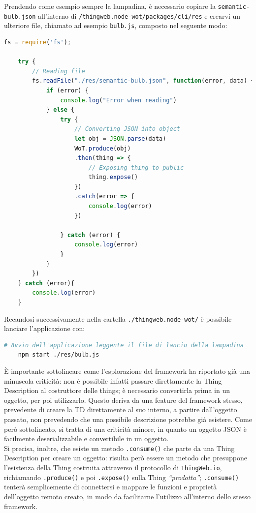 \documentclass[12pt,a4paper,openright,oneside]{report}
\newcommand{\quotes}[1]{``#1''}
\begin{document}
Prendendo come esempio sempre la lampadina, è necessario copiare la \texttt{semantic-bulb.json} all'interno di \texttt{/thingweb.node-wot/packages/cli/res} e crearvi un ulteriore file, chiamato ad esempio \texttt{bulb.js}, composto nel seguente modo:
\begin{lstlisting}[language=JavaScript]
	fs = require('fs');
	
	try {
		// Reading file
		fs.readFile("./res/semantic-bulb.json", function(error, data) {
			if (error) {
				console.log("Error when reading")
			} else {
				try {
					// Converting JSON into object
					let obj = JSON.parse(data)
					WoT.produce(obj)
					.then(thing => {
						// Exposing thing to public
						thing.expose()
					})
					.catch(error => {
						console.log(error)
					})
					
				} catch (error) {
					console.log(error)
				}
			}
		})
	} catch (error){
		console.log(error)
	}
\end{lstlisting}

Recandosi successivamente nella cartella \texttt{./thingweb.node-wot/} è possibile lanciare l'applicazione con:

\begin{lstlisting}[language=bash]
	# Avvio dell'applicazione leggente il file di lancio della lampadina
	npm start ./res/bulb.js
\end{lstlisting}

È importante sottolineare come l'esplorazione del framework ha riportato già una minuscola criticità: non è possibile infatti passare direttamente la Thing Description al costruttore delle things; è necessario convertirla prima in un oggetto, per poi utilizzarlo. Questo deriva da una feature del framework stesso, prevedente di creare la TD direttamente al suo interno, a partire dall'oggetto passato, non prevedendo che una possibile descrizione potrebbe già esistere. Come però sottolineato, si tratta di una criticità minore, in quanto un oggetto JSON è facilmente deserializzabile e convertibile in un oggetto.\\

Si precisa, inoltre, che esiste un metodo \texttt{.consume()} che parte da una Thing Description per creare un oggetto: risulta però essere un metodo che presuppone l'esistenza della Thing costruita attraverso il protocollo di \texttt{ThingWeb.io}, richiamando \texttt{.produce()} e poi \texttt{.expose()} sulla Thing \textit{\quotes{prodotta}}; \texttt{.consume()} tenterà semplicemente di connettersi e mappare le funzioni e proprietà dell'oggetto remoto creato, in modo da facilitarne l'utilizzo all'interno dello stesso framework.\\
\end{document}
